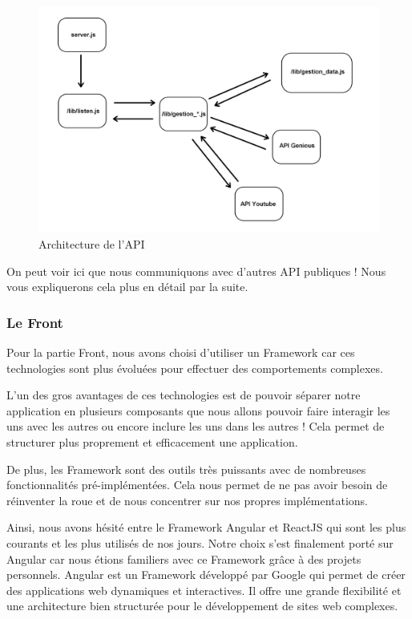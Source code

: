 \documentclass[12pt,french]{article}
\begin{document}
\begin{figure}[H]
	\centering
	\includegraphics[scale=0.16]{api.png}
	\caption{Architecture de l'API}
\end{figure}

\medskip

On peut voir ici que nous communiquons avec d'autres API publiques ! Nous vous expliquerons cela plus en détail par la suite.

\subsubsection{Le Front}

Pour la partie Front, nous avons choisi d'utiliser un Framework car ces technologies sont plus évoluées pour effectuer des comportements complexes.

\medskip

L'un des gros avantages de ces technologies est de pouvoir séparer notre application en plusieurs composants que nous allons pouvoir faire interagir les uns avec les autres ou encore inclure les uns dans les autres ! Cela permet de structurer plus proprement et efficacement une application.

\medskip

De plus, les Framework sont des outils très puissants avec de nombreuses fonctionnalités pré-implémentées. Cela nous permet de ne pas avoir besoin de réinventer la roue et de nous concentrer sur nos propres implémentations.

\medskip

Ainsi, nous avons hésité entre le Framework Angular et ReactJS qui sont les plus courants et les plus utilisés de nos jours. Notre choix s'est finalement porté sur Angular car nous étions familiers avec ce Framework grâce à des projets personnels. Angular est un Framework développé par Google qui permet de créer des applications web dynamiques et interactives. Il offre une grande flexibilité et une architecture bien structurée pour le développement de sites web complexes.
\end{document}
